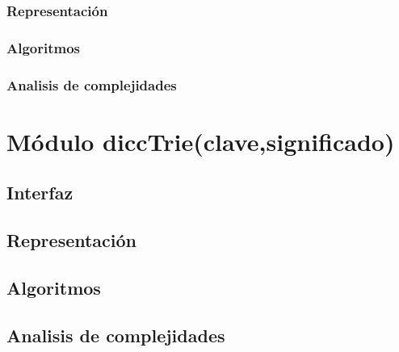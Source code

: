 \documentclass[12pt, a4paper]{article}
\begin{document}
\subsubsection{Representaci\'on}

\subsubsection{Algoritmos}

\subsubsection{Analisis de complejidades}

\newpage 
\section{M\'odulo diccTrie(clave,significado)}
\subsection{Interfaz}

\subsection{Representaci\'on}

\subsection{Algoritmos}

\subsection{Analisis de complejidades}

\newpage
\end{document}
